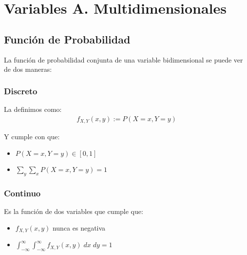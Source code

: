 \documentclass[12pt, fleqn]{report}                             %
\theoremstyle{break}                                            %
\newcommand{\inftyInt} {\int_{-\infty}^{\infty}}                %
\begin{document}
    \chapter{Variables A. Multidimensionales}


        \clearpage
        \section{Función de Probabilidad}

            La función de probabilidad conjunta de una variable bidimensional se puede ver de dos
            maneras:

            \vspace{1em}
            \subsection{Discreto}

                La definimos como:
                \begin{align*}
                    f_{X, Y}(x, y) := P(X = x, Y = y)
                \end{align*}

                Y cumple con que:
                \begin{itemize}
                    \item $P(X = x, Y = y) \in [0, 1]$
                    \item $\displaystyle \sum_y \sum_x P(X = x, Y = y) = 1$ 
                \end{itemize}

            \vspace{1em}
            \subsection{Continuo}

                Es la función de dos variables que cumple que:
                \begin{itemize}
                    \item $f_{X, Y}(x, y)$ nunca es negativa
                    \item $\displaystyle \inftyInt \inftyInt f_{X, Y}(x, y) \; dx \; dy = 1$ 
                \end{itemize}
                
\end{document}
